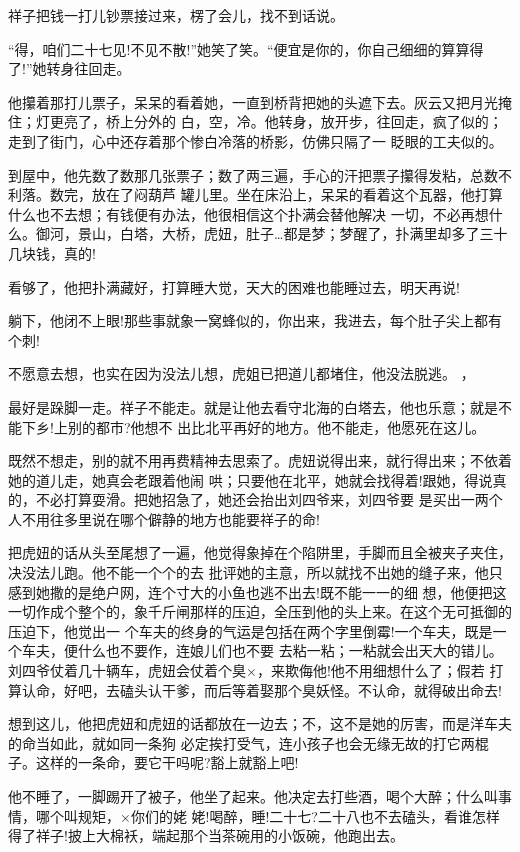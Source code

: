 \documentclass[11pt,a4paper,onecolumn]{article}
\begin{document}
祥子把钱\myrule 一打儿钞票\myrule 接过来，楞了会儿，找不到话说。

``得，咱们二十七见!不见不散!''她笑了笑。``便宜是你的，你自己细细的算算得了!''她转身往回走。

他攥着那打儿票子，呆呆的看着她，一直到桥背把她的头遮下去。灰云又把月光掩住；灯更亮了，桥上分外的
白，空，冷。他转身，放开步，往回走，疯了似的；走到了街门，心中还存着那个惨白冷落的桥影，仿佛只隔了一
眨眼的工夫似的。

到屋中，他先数了数那几张票子；数了两三遍，手心的汗把票子攥得发粘，总数不利落。数完，放在了闷葫芦
罐儿里。坐在床沿上，呆呆的看着这个瓦器，他打算什么也不去想；有钱便有办法，他很相信这个扑满会替他解决
一切，不必再想什么。御河，景山，白塔，大桥，虎妞，肚子\ldots 都是梦；梦醒了，扑满里却多了三十几块钱，真的!

看够了，他把扑满藏好，打算睡大觉，天大的困难也能睡过去，明天再说!

躺下，他闭不上眼!那些事就象一窝蜂似的，你出来，我进去，每个肚子尖上都有个刺!

不愿意去想，也实在因为没法儿想，虎姐已把道儿都堵住，他没法脱逃。 ，

最好是跺脚一走。祥子不能走。就是让他去看守北海的白塔去，他也乐意；就是不能下乡!上别的都市?他想不
出比北平再好的地方。他不能走，他愿死在这儿。

既然不想走，别的就不用再费精神去思索了。虎妞说得出来，就行得出来；不依着她的道儿走，她真会老跟着他闹
哄；只要他在北平，她就会找得着!跟她，得说真的，不必打算耍滑。把她招急了，她还会抬出刘四爷来，刘四爷要
是买出一两个人\myrule 不用往多里说\myrule 在哪个僻静的地方也能要祥子的命!

把虎妞的话从头至尾想了一遍，他觉得象掉在个陷阱里，手脚而且全被夹子夹住，决没法儿跑。他不能一个个的去
批评她的主意，所以就找不出她的缝子来，他只感到她撒的是绝户网，连个寸大的小鱼也逃不出去!既不能一一的细
想，他便把这一切作成个整个的，象千斤闸那样的压迫，全压到他的头上来。在这个无可抵御的压迫下，他觉出一
个车夫的终身的气运是包括在两个字里\myrule 倒霉!一个车夫，既是一个车夫，便什么也不要作，连娘儿们也不要
去粘一粘；一粘就会出天大的错儿。刘四爷仗着几十辆车，虎妞会仗着个臭×，来欺侮他!他不用细想什么了；假若
打算认命，好吧，去磕头认干爹，而后等着娶那个臭妖怪。不认命，就得破出命去!

想到这儿，他把虎妞和虎妞的话都放在一边去；不，这不是她的厉害，而是洋车夫的命当如此，就如同一条狗
必定挨打受气，连小孩子也会无缘无故的打它两棍子。这样的一条命，要它干吗呢?豁上就豁上吧!

他不睡了，一脚踢开了被子，他坐了起来。他决定去打些酒，喝个大醉；什么叫事情，哪个叫规矩，×你们的姥
姥!喝醉，睡!二十七?二十八也不去磕头，看谁怎样得了祥子!披上大棉袄，端起那个当茶碗用的小饭碗，他跑出去。
\end{document}
